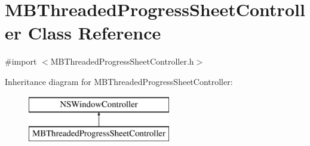 \hypertarget{interface_m_b_threaded_progress_sheet_controller}{\section{M\-B\-Threaded\-Progress\-Sheet\-Controller Class Reference}
\label{interface_m_b_threaded_progress_sheet_controller}
}


{\ttfamily \#import $<$M\-B\-Threaded\-Progress\-Sheet\-Controller.\-h$>$}

Inheritance diagram for M\-B\-Threaded\-Progress\-Sheet\-Controller\-:\begin{figure}[H]
\begin{center}
\leavevmode
\includegraphics[height=2.000000cm]{interface_m_b_threaded_progress_sheet_controller}
\end{center}
\end{figure}
